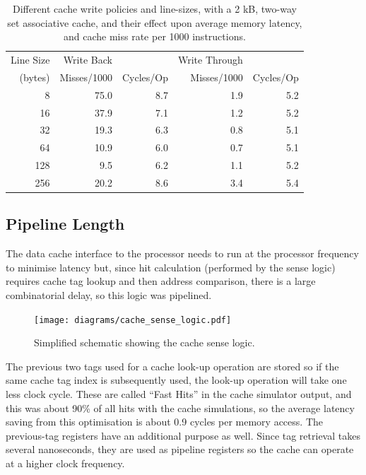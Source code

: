 \begin{table}[h]
\begin{center}
\begin{tabular}{r | r r | r r }
Line Size & Write Back & & Write Through & \\
(bytes) & Misses/1000 & Cycles/Op & Misses/1000 & Cycles/Op \\
\hline
8   &  75.0 &  8.7 & 1.9 & 5.2 \\
16  &  37.9 &  7.1 & 1.2 & 5.2 \\
32  &  19.3 &  6.3 & 0.8 & 5.1 \\
64  &  10.9 &  6.0 & 0.7 & 5.1 \\
128 &   9.5 &  6.2 & 1.1 & 5.2 \\
256 &  20.2 &  8.6 & 3.4 & 5.4 \\
\end{tabular}
\caption[Cache Write Policies vs. Performance]{Different cache write policies
and line-sizes, with a 2 kB, two-way set associative cache, and their effect
upon average memory latency, and cache miss rate per 1000 instructions.}
\label{Write_Policy}
\end{center}
\end{table}


\subsection{Pipeline Length}
\label{CACHE_Pipeline}
The data cache interface to the processor needs to run at the processor frequency
to minimise latency but, since hit calculation (performed by the sense logic)
requires cache tag lookup and then address comparison, there is a large
combinatorial delay, so this logic was pipelined.

\begin{figure}[h!]
\begin{center}
\texttt{[image: diagrams/cache\_sense\_logic.pdf]}
\caption[Simplified Schematic of the Cache Sense Logic]{Simplified schematic
showing the cache sense logic.}
\label{CACHE_Sense}
\end{center}
\end{figure}

The previous two tags used for a cache look-up operation are stored so if the
same cache tag index is subsequently used, the look-up operation will take one
less clock cycle. These are called ``Fast Hits'' in the cache simulator output,
and this was about 90\% of all hits with the cache simulations, so the average
latency saving from this optimisation is about 0.9 cycles per memory access. The
previous-tag registers have an additional purpose as well. Since tag retrieval
takes several nanoseconds, they are used as pipeline registers so the cache can
operate at a higher clock frequency.

